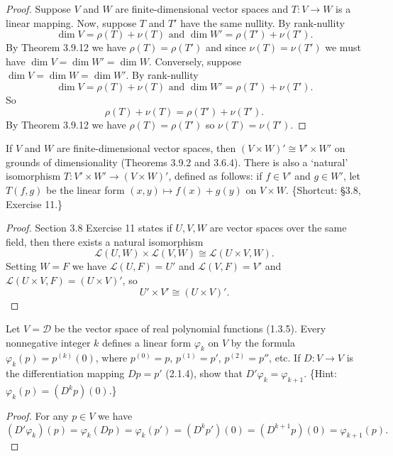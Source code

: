 \begin{proof}
    Suppose $V$ and $W$ are finite-dimensional vector spaces and $T : V \to W$ is a linear mapping.
    Now, suppose $T$ and $T'$ have the same nullity.
    By rank-nullity 
    \[\dim V = \rho(T) + \nu(T) \text{ and } \dim W' = \rho(T') + \nu(T').\]
    By Theorem 3.9.12 we have $\rho(T) = \rho(T')$
        and since $\nu(T) = \nu(T')$ we must have $\dim V = \dim W' = \dim W$.
    Conversely, suppose $\dim V = \dim W = \dim W'$.
    By rank-nullity 
    \[\dim V = \rho(T) + \nu(T) \text{ and } \dim W' = \rho(T') + \nu(T').\]
    So 
    \[\rho(T) + \nu(T) = \rho(T') + \nu(T').\]
    By Theorem 3.9.12 we have $\rho(T) = \rho(T')$
        so $\nu(T) = \nu(T')$.
\end{proof}

\begin{tcolorbox}[title=Exercise 4, breakable]
    If $V$ and $W$ are finite-dimensional vector spaces, then 
    $(V \times W)' \cong V' \times W'$ on grounds of dimensionality (Theorems 3.9.2 and 
    3.6.4). There is also a `natural' isomorphism $T : V' \times W' \to (V \times W)'$, 
    defined as follows: if $f \in V'$ and $g \in W'$, let $T(f, g)$ be the linear form 
    $(x, y) \mapsto f(x) + g(y)$ on $V \times W$. \{Shortcut: \S 3.8, Exercise 11.\}
\end{tcolorbox}

\begin{proof}
    Section 3.8 Exercise 11 states if $U, V, W$ are vector spaces over the same field, 
    then there exists a natural isomorphism
    \[\mathcal{L}(U, W) \times \mathcal{L}(V, W) \cong \mathcal{L}(U \times V, W).\]
    Setting $W = F$ we have $\mathcal{L}(U, F) = U'$ and 
    $\mathcal{L}(V, F) = V'$ and $\mathcal{L}(U \times V, F) = (U \times V)'$,
    so
    \[U' \times V' \cong (U \times V)'.\]
\end{proof}

\begin{tcolorbox}[title=Exercise 5, breakable]
    Let $V = \mathcal{D}$ be the vector space of real polynomial functions (1.3.5).
    Every nonnegative integer $k$ defines a linear form $\varphi_k$ on $V$ by the 
    formula $\varphi_k(p) = p^{(k)}(0)$, where $p^{(0)} = p$, $p^{(1)} = p'$, 
    $p^{(2)} = p''$, etc. If $D : V \to V$ is the differentiation mapping $Dp = p'$ 
    (2.1.4), show that $D'\varphi_k = \varphi_{k+1}$. 
    \{Hint: $\varphi_k(p) = (D^k p)(0)$.\}
\end{tcolorbox}

\begin{proof}
    For any $p \in V$ we have
    \[(D'\varphi_k)(p) = \varphi_k(Dp) = \varphi_k(p') = (D^k p')(0) = (D^{k+1}p)(0) = \varphi_{k+1}(p).\]
\end{proof}


